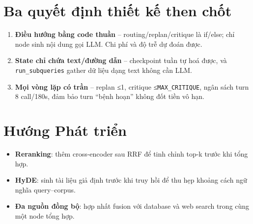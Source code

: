 \documentclass[12pt, a4paper]{report}
\begin{document}
\section{Ba quyết định thiết kế then chốt}

\begin{enumerate}
  \item \textbf{Điều hướng bằng code thuần} -- routing/replan/critique là if/else; chỉ node sinh nội dung gọi LLM. Chi phí và độ trễ dự đoán được.
  \item \textbf{State chỉ chứa text/đường dẫn} -- checkpoint tuần tự hoá được, và \texttt{run\_subqueries} gather dữ liệu dạng text không cần LLM.
  \item \textbf{Mọi vòng lặp có trần} -- replan ≤1, critique ≤\texttt{MAX\_CRITIQUE}, ngân sách turn 8 call/180s, đảm bảo turn ``bệnh hoạn'' không đốt tiền vô hạn.
\end{enumerate}

\section{Hướng Phát triển}

\begin{itemize}
  \item \textbf{Reranking}: thêm cross-encoder sau RRF để tinh chỉnh top-k trước khi tổng hợp.
  \item \textbf{HyDE}: sinh tài liệu giả định trước khi truy hồi để thu hẹp khoảng cách ngữ nghĩa query--corpus.
  \item \textbf{Đa nguồn đồng bộ}: hợp nhất fusion với database và web search trong cùng một node tổng hợp.
\end{itemize}

\newpage
\end{document}
